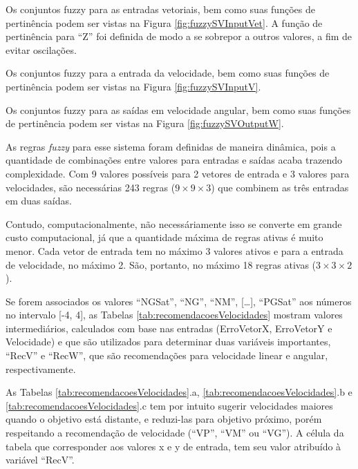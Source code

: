 	
	
	Os conjuntos fuzzy para as entradas vetoriais, bem como suas funções de pertinência podem 
	ser vistas na Figura \ref{fig:fuzzySVInputVet}. A função de pertinência para ``Z'' foi
	definida de modo a se sobrepor a outros valores, a fim de evitar oscilações.
	
	
	
	Os conjuntos fuzzy para a entrada da velocidade, bem como suas funções de pertinência podem 
	ser vistas na Figura \ref{fig:fuzzySVInputV}. 
	
	
	
	Os conjuntos fuzzy para as saídas em velocidade angular, bem como suas funções de 
	pertinência podem ser vistas na Figura \ref{fig:fuzzySVOutputW}.
	
	
	
	As regras \textit{fuzzy} para esse sistema foram definidas de maneira dinâmica, pois a 
	quantidade de combinações entre valores para entradas e saídas acaba trazendo complexidade.
	Com 9 valores possíveis para 2 vetores de entrada e 3 valores para velocidades, são
	necessárias 243 regras ($9\times9\times3$) que combinem as três entradas em duas saídas.
	
	Contudo, computacionalmente, não necessáriamente isso se converte em grande custo 
	computacional, já que a quantidade máxima de regras ativas é muito menor. Cada vetor de
	entrada tem no máximo 3 valores ativos e para a entrada de velocidade, no máximo 2. São,
	portanto, no máximo 18 regras ativas ($3\times3\times2$).
	
	Se forem associados os valores ``NGSat'', ``NG'', ``NM'', [\dots], ``PGSat'' aos números 
	no intervalo [-4, 4], as Tabelas \ref{tab:recomendacoesVelocidades} mostram valores
	intermediários, calculados com base nas entradas (ErroVetorX, ErroVetorY e Velocidade) e 
	que são utilizados para determinar duas variáveis importantes, ``RecV'' e ``RecW'', que 
	são recomendações para velocidade linear e angular, respectivamente. 
	
	
	
	As Tabelas \ref{tab:recomendacoesVelocidades}.a, \ref{tab:recomendacoesVelocidades}.b e 
	\ref{tab:recomendacoesVelocidades}.c tem por intuito sugerir velocidades maiores quando 
	o objetivo está distante, e reduzi-las para objetivo próximo, porém respeitando a 
	recomendação de velocidade (``VP'', ``VM'' ou ``VG''). A célula da tabela que corresponder
	aos valores x e y de entrada, tem seu valor atribuído à variável ``RecV''. 
	
